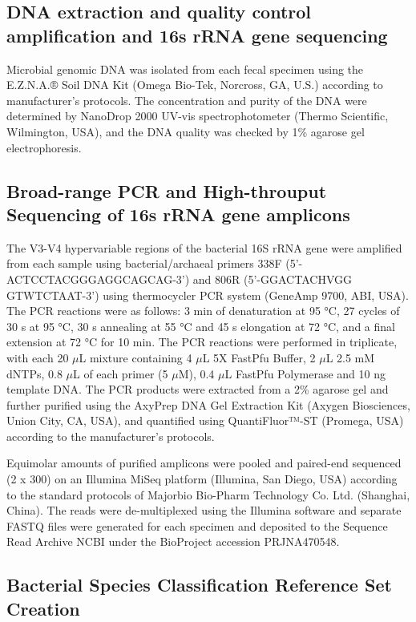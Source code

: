 \documentclass[fleqn,10pt,lineno]{wlpeerj} %
\begin{document}
  \subsection*{DNA extraction and quality control amplification and 16s rRNA gene sequencing}
  Microbial genomic DNA was isolated from each fecal specimen using the E.Z.N.A.® Soil DNA Kit (Omega Bio-Tek, Norcross, GA, U.S.) according to manufacturer’s protocols. The concentration and purity of the DNA were determined by NanoDrop 2000 UV-vis spectrophotometer (Thermo Scientific, Wilmington, USA), and the DNA quality was checked by 1\% agarose gel electrophoresis.

  \subsection*{Broad-range PCR and High-throuput Sequencing of 16s rRNA gene amplicons}
  The V3-V4 hypervariable regions of the bacterial 16S rRNA gene were amplified from each sample using bacterial/archaeal primers 338F (5’-ACTCCTACGGGAGGCAGCAG-3’) and 806R (5’-GGACTACHVGG GTWTCTAAT-3’) using thermocycler PCR system (GeneAmp 9700, ABI, USA). The PCR reactions were as follows: 3 min of denaturation at 95 °C, 27 cycles of 30 s at 95 °C, 30 s annealing at 55 °C and 45 s elongation at 72 °C, and a final extension at 72 °C for 10 min. The PCR reactions were performed in triplicate, with each 20 $\mu$L mixture containing 4 $\mu$L 5X FastPfu Buffer, 2 $\mu$L 2.5 mM dNTPs, 0.8 $\mu$L of each primer (5 $\mu$M), 0.4 $\mu$L FastPfu Polymerase and 10 ng template DNA. The PCR products were extracted from a 2\% agarose gel and further purified using the AxyPrep DNA Gel Extraction Kit (Axygen Biosciences, Union City, CA, USA), and quantified using QuantiFluor™-ST (Promega, USA) according to the manufacturer’s protocols.

  Equimolar amounts of purified amplicons were pooled and paired-end sequenced (2 x 300) on an Illumina MiSeq platform (Illumina, San Diego, USA) according to the standard protocols of Majorbio Bio-Pharm Technology Co. Ltd. (Shanghai, China). The reads were de-multiplexed using the Illumina software and separate FASTQ files were generated for each specimen and deposited to the Sequence Read Archive NCBI under the BioProject accession PRJNA470548.

  \subsection*{Bacterial Species Classification Reference Set Creation}
\end{document}
